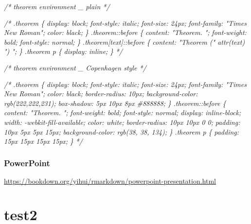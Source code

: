 \documentclass[
]{book}
\newenvironment{Shaded}{\begin{snugshade}}{\end{snugshade}}
\newcommand{\CommentTok}[1]{\textcolor[rgb]{0.56,0.35,0.01}{\textit{#1}}}
\theoremstyle{definition}
\theoremstyle{definition}
\theoremstyle{definition}
\theoremstyle{definition}
\theoremstyle{remark}
\begin{document}
\begin{Shaded}
\begin{Highlighting}[]

\CommentTok{/* theorem environment \_ plain */}

\CommentTok{/*}
\CommentTok{.theorem \{}
\CommentTok{  display: block;}
\CommentTok{  font{-}style: italic;}
\CommentTok{  font{-}size: 24px;}
\CommentTok{  font{-}family: "Times New Roman";}
\CommentTok{  color: black;}
\CommentTok{\}}
\CommentTok{.theorem::before \{}
\CommentTok{  content: "Theorem. ";}
\CommentTok{  font{-}weight: bold;}
\CommentTok{  font{-}style: normal;}
\CommentTok{\}}
\CommentTok{.theorem[text]::before \{}
\CommentTok{  content: "Theorem (" attr(text) ") ";}
\CommentTok{\}}
\CommentTok{.theorem p \{}
\CommentTok{  display: inline;}
\CommentTok{\}}
\CommentTok{*/}

\CommentTok{/* theorem environment \_ Copenhagen style */}

\CommentTok{/*}
\CommentTok{.theorem \{}
\CommentTok{  display: block;}
\CommentTok{  font{-}style: italic;}
\CommentTok{  font{-}size: 24px;}
\CommentTok{  font{-}family: "Times New Roman";}
\CommentTok{  color: black;}
\CommentTok{  border{-}radius: 10px;}
\CommentTok{  background{-}color: rgb(222,222,231);}
\CommentTok{  box{-}shadow: 5px 10px 8px \#888888;}
\CommentTok{\}}
\CommentTok{.theorem::before \{}
\CommentTok{  content: "Theorem. ";}
\CommentTok{  font{-}weight: bold;}
\CommentTok{  font{-}style: normal;}
\CommentTok{  display: inline{-}block;}
\CommentTok{  width: {-}webkit{-}fill{-}available;}
\CommentTok{  color: white;}
\CommentTok{  border{-}radius: 10px 10px 0 0;}
\CommentTok{  padding: 10px 5px 5px 15px;}
\CommentTok{  background{-}color: rgb(38, 38, 134);}
\CommentTok{\}}
\CommentTok{.theorem p \{}
\CommentTok{  padding: 15px 15px 15px 15px;}
\CommentTok{\}}
\CommentTok{*/}
\end{Highlighting}
\end{Shaded}

\hypertarget{powerpoint}{%
\subsection{PowerPoint}\label{powerpoint}}

\url{https://bookdown.org/yihui/rmarkdown/powerpoint-presentation.html}

\hypertarget{test2}{%
\chapter{test2}\label{test2}}
\end{document}
